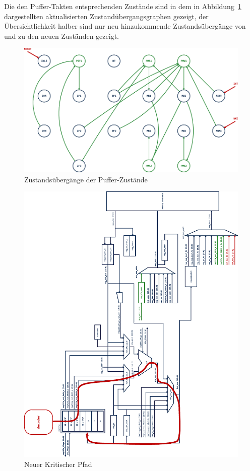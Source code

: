 \documentclass[ngerman, cd=lightcolor]{tudscrreprt}
\begin{document}
Die den Puffer-Takten entsprechenden Zustände sind in dem in
Abbildung~\ref{img:fsm-states-optimized} dargestellten aktualisierten
Zustandübergangsgraphen gezeigt, der Übersichtlichkeit halber sind nur neu
hinzukommende Zustandsübergänge von und zu den neuen Zuständen gezeigt.

\begin{figure}[htbp]
  \centering
    \includegraphics[width=\textwidth]{resources/pdf/fsm-states-optimized.pdf}
  \caption{Zustandsübergänge der Puffer-Zustände}
  \label{img:fsm-states-optimized}
\end{figure}

\begin{figure}[htbp]
  \centering
    \includegraphics[height=\textwidth,angle=-90]{resources/pdf/datapath-optimized-critical.pdf}
  \caption{Neuer Kritischer Pfad}
  \label{img:datapath-optimized-critical-path}
\end{figure}
\end{document}
